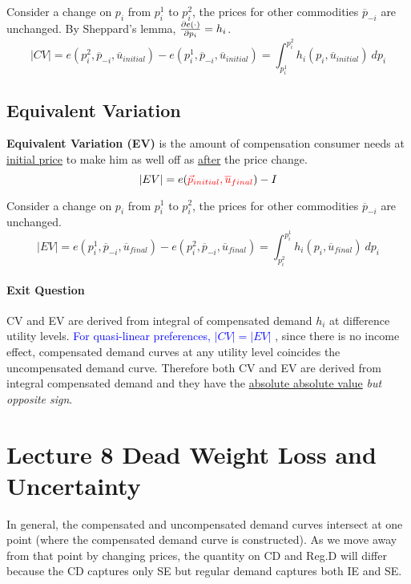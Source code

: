 \documentclass[]{article}
\begin{document}
            \begin{remark}
                Consider a change on $p_i$ from $p_i^1$ to $p_i^2$, the prices for other commodities $\overline{p}_{-i}$ are unchanged. By Sheppard's lemma, $\frac{\partial{e(\cdot)}}{\partial{p_i}} = h_i$.
                \[
                    |CV| = e(p_i^2, \overline{p}_{-i}, \overline{u}_{initial}) - e(p_i^1, \overline{p}_{-i}, \overline{u}_{initial}) = \int_{p_i^1}^{p_i^2}{h_i(p_i, \overline{u}_{initial})\ dp_i}
                \]
            \end{remark}
        
        \subsection{Equivalent Variation}
            \begin{definition}
                \textbf{Equivalent Variation (EV)} is the amount of compensation consumer needs at \ul{initial price} to make him as well off as \ul{after} the price change.
                \[
                    |EV| = e(
                    \textcolor{red}{
                        \vec{p}_{initial}, \overline{u}_{final}
                        }) - I 
                \]
            \end{definition}
        
        \begin{remark}
            Consider a change on $p_i$ from $p_i^1$ to $p_i^2$, the prices for other commodities $\overline{p}_{-i}$ are unchanged.
            \[
                |EV| = e(p_i^1, \overline{p}_{-i}, \overline{u}_{final}) - e(p_i^2, \overline{p}_{-i}, \overline{u}_{final}) = \int_{p_i^2}^{p_i^1}{h_i(p_i, \overline{u}_{final})\ dp_i}
            \]
        \end{remark}
        
        \paragraph{Exit Question}
            CV and EV are derived from integral of compensated demand $h_i$ at difference utility levels.
            \textcolor{blue}{For quasi-linear preferences, $|CV| = |EV|$}
            , since there is no income effect, compensated demand curves at any utility level coincides the uncompensated demand curve. Therefore both CV and EV are derived from integral compensated demand and they have the \ul{absolute absolute value} \emph{but opposite sign}.
    
    \section{Lecture 8 Dead Weight Loss and Uncertainty}
        \begin{remark}
            In general, the compensated and uncompensated demand curves intersect at one point (where the compensated demand curve is constructed). As we move away from that point by changing prices, the quantity on CD and Reg.D will differ because the CD captures only SE but regular demand captures both IE and SE.
        \end{remark}
        
\end{document}
